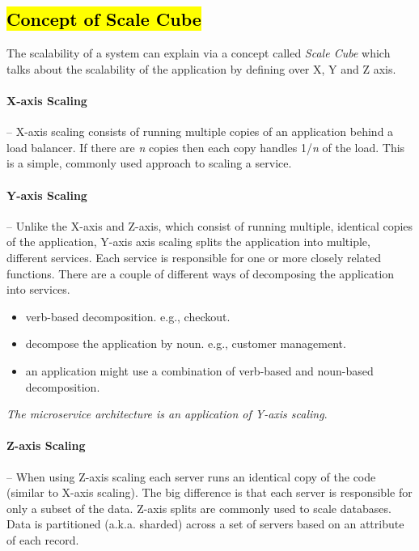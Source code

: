 \subsection{\hl{Concept of Scale Cube}}
\label{subse:scale_cube}
The scalability of a system can explain via a concept called \emph{Scale Cube} which talks about the scalability of the application by defining over X, Y and Z axis.

\paragraph{X-axis Scaling}-- X-axis scaling consists of running multiple copies of an application behind a load balancer. If there are \textit{n} copies then each copy handles 1/\textit{n} of the load. This is a simple, commonly used approach to scaling a service.

\paragraph{Y-axis Scaling}-- Unlike the X-axis and Z-axis, which consist of running multiple, identical copies of the application, Y-axis axis scaling splits the application into multiple, different services. Each service is responsible for one or more closely related functions. There are a couple of different ways of decomposing the application into services.
\begin{itemize}
    \item verb-based decomposition. e.g., checkout.
    \item decompose the application by noun. e.g., customer management. 
    \item an application might use a combination of verb-based and noun-based decomposition.
\end{itemize}

\emph{The microservice architecture is an application of Y-axis scaling}.

\paragraph{Z-axis Scaling}-- When using Z-axis scaling each server runs an identical copy of the code (similar to X-axis scaling). The big difference is that each server is responsible for only a subset of the data. 
Z-axis splits are commonly used to scale databases. Data is partitioned (a.k.a. sharded) across a set of servers based on an attribute of each record.

